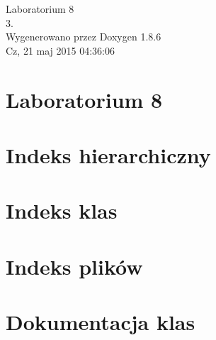 \documentclass[twoside]{article}
\begin{document}
\hypersetup{pageanchor=false}
\begin{titlepage}
\vspace*{7cm}
\begin{center}%
{\Large Laboratorium 8 \\[1ex]\large 3. }\\
\vspace*{1cm}
{\large Wygenerowano przez Doxygen 1.8.6}\\
\vspace*{0.5cm}
{\small Cz, 21 maj 2015 04:36:06}\\
\end{center}
\end{titlepage}
\tableofcontents
{}
\hypersetup{pageanchor=true}

\section{Laboratorium 8}
\label{index}\hypertarget{index}{}
\section{Indeks hierarchiczny}

\section{Indeks klas}

\section{Indeks plików}

\section{Dokumentacja klas}






















\end{document}
